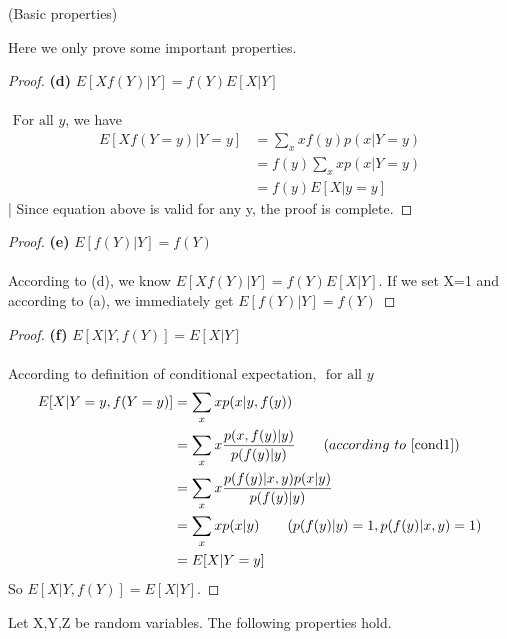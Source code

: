 \begin{enumerate}
\begin{lemma}{(Basic properties)}
\begin{enumerate}
		      \end{enumerate}

	      \end{lemma}
	      Here we only prove some important properties.
	      \begin{proof}{\textbf{(d)} $E[Xf(Y)|Y] = f(Y)E[X|Y]$}
		      \\ \\ $\text{ For all } y$, we have
		      \begin{align*}
			      E[Xf(Y=y)|Y=y] & = \sum_{x}xf(y)p(x|Y=y) \\
			                     & = f(y)\sum_{x}xp(x|Y=y) \\
			                     & = f(y)E[X|y=y]
		      \end{align*}
		      | Since equation above is valid for any y, the proof is complete.
	      \end{proof}
	      \begin{proof}{\textbf{(e)} $E[f(Y)|Y] = f(Y)$}
		      \\ \\According to (d), we know $E[Xf(Y)|Y] = f(Y)E[X|Y]$. If we set X=1 and according to (a), we immediately get
		      $E[f(Y)|Y] = f(Y)$
	      \end{proof}
	      \begin{proof}{\textbf{(f)} $E[X|Y,f(Y)] = E[X|Y]$}
		      \\ \\According to definition of conditional expectation, $\text{ for all } y$
		      \begin{align*}
			      E[X|Y=y,f(Y=y)] & = \sum_{x}xp(x|y,f(y))                                                       \\
			                      & =\sum_{x}x \frac{p(x,f(y)|y)}{p(f(y)|y)} \qquad (according\ to\ \ref{cond1}) \\
			                      & =\sum_{x}x \frac{p(f(y)|x,y)p(x|y)}{p(f(y)|y)}                               \\
			                      & =\sum_{x}xp(x|y) \qquad (p(f(y)|y)=1, p(f(y)|x,y)=1)                         \\
			                      & = E[X|Y=y]
		      \end{align*}
		      So $E[X|Y,f(Y)] = E[X|Y]$.
	      \end{proof}

	      \begin{lemma}{Let X,Y,Z be random variables. The following properties hold.}
		      \begin{enumerate}


\end{enumerate}
\end{lemma}
\end{enumerate}
